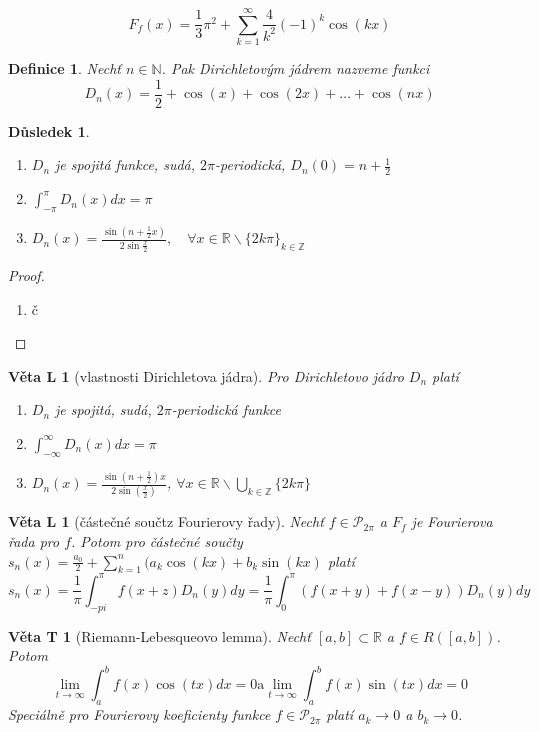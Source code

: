 \documentclass[11pt,a4paper]{article}
\newcounter{vety}
\newtheorem*{definice}{Definice}
\newtheorem{vetal}[vety]{Věta L}
\newtheorem{vetat}[vety]{Věta T}
\newtheorem*{dusledek}{Důsledek}
\begin{document}
$$F_f(x) = \frac{1}{3} \pi^2 + \sum_{k=1}^{\infty} \frac{4}{k^2} (-1)^k \cos (kx)$$

\begin{definice}
Nechť $n \in \mathbb{N}$. Pak \emph{Dirichletovým jádrem} nazveme funkci
$$D_n(x) = \frac{1}{2}+\cos(x)+\cos(2x)+\ldots+\cos(nx)$$
\end{definice}

\begin{dusledek}
\begin{enumerate}
\item $D_n$ je spojitá funkce, sudá, $2 \pi$-periodická, $D_n(0) = n + \frac{1}{2}$
\item $\int_{-\pi}^\pi D_n(x) dx = \pi$
\item $D_n(x) = \frac{\sin \left( n + \frac{1}{2} x \right)}{2 \sin \frac{x}{2}}, \quad \forall x \in \mathbb{R} \backslash \{ 2 k \pi \}_{k \in \mathbb{Z}}$
\end{enumerate}
\end{dusledek}

\begin{proof}
\begin{enumerate}
\item č
\end{enumerate}
\end{proof}

\begin{vetal}[vlastnosti Dirichletova jádra]
Pro Dirichletovo jádro $D_n$ platí
\begin{enumerate}
\item $D_n$ je spojitá, sudá, $2 \pi$-periodická funkce
\item $\int_{-\infty}^{\infty} D_n (x) dx = \pi$
\item $D_n(x) = \frac{\sin \left( n + \frac{1}{2} \right) x}{2 \sin \left( \frac{x}{2} \right)}$, $\forall x \in \mathbb{R} \backslash \bigcup_{k \in \mathbb{Z}} \{ 2k \pi \}$
\end{enumerate}
\end{vetal}

\begin{vetal}[částečné součtz Fourierovy řady]
Nechť $f \in \mathcal{P}_{2 \pi}$ a $F_f$ je Fourierova řada pro $f$. Potom pro částečné součty $s_n(x) = \frac{a_0}{2} + \sum_{k=1}^{n} (a_k \cos ( kx) + b_k \sin ( kx )$ platí
$$s_n(x) = \frac{1}{\pi} \int_{-pi}^\pi f(x+z)D_n(y)dy = \frac{1}{\pi} \int_0^\pi \left( f(x+y) + f(x-y) \right) D_n(y) dy$$
\end{vetal}

\begin{vetat}[Riemann-Lebesqueovo lemma]
Nechť $[a,b] \subset \mathbb{R}$ a $f \in R([a,b])$. Potom
$$\lim_{t \rightarrow \infty} \int_a^b f(x) \cos(tx) dx = 0 \mathrm{a} \lim_{t \rightarrow \infty} \int_a^b f(x) \sin(tx) dx = 0$$
Speciálně pro Fourierovy koeficienty funkce $f \in \mathcal{P}_{2 \pi}$ platí $a_k \rightarrow 0$ a $b_k \rightarrow 0$.
\end{vetat}
\end{document}
